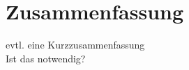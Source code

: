\chapter*{Zusammenfassung}\label{s:uebersicht}


evtl. eine Kurzzusammenfassung\\
Ist das notwendig?


